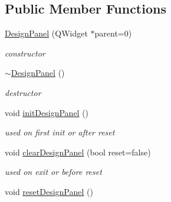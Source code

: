 \subsection*{Public Member Functions}
\begin{DoxyCompactItemize}
\item 
\hyperlink{classgui_1_1DesignPanel_a96429541df71c297fed42ae90744baf0}{Design\+Panel} (Q\+Widget $\ast$parent=0)\hypertarget{classgui_1_1DesignPanel_a96429541df71c297fed42ae90744baf0}{}\label{classgui_1_1DesignPanel_a96429541df71c297fed42ae90744baf0}

\begin{DoxyCompactList}\small\item\em constructor \end{DoxyCompactList}\item 
\hyperlink{classgui_1_1DesignPanel_aaf0992b9895822ba207eab17fd0023d9}{$\sim$\+Design\+Panel} ()\hypertarget{classgui_1_1DesignPanel_aaf0992b9895822ba207eab17fd0023d9}{}\label{classgui_1_1DesignPanel_aaf0992b9895822ba207eab17fd0023d9}

\begin{DoxyCompactList}\small\item\em destructor \end{DoxyCompactList}\item 
void \hyperlink{classgui_1_1DesignPanel_aed5d80b7651f3e25842d28f6192d4132}{init\+Design\+Panel} ()\hypertarget{classgui_1_1DesignPanel_aed5d80b7651f3e25842d28f6192d4132}{}\label{classgui_1_1DesignPanel_aed5d80b7651f3e25842d28f6192d4132}

\begin{DoxyCompactList}\small\item\em used on first init or after reset \end{DoxyCompactList}\item 
void \hyperlink{classgui_1_1DesignPanel_a5535f348b3dbcd86b15eed386b533dfc}{clear\+Design\+Panel} (bool reset=false)\hypertarget{classgui_1_1DesignPanel_a5535f348b3dbcd86b15eed386b533dfc}{}\label{classgui_1_1DesignPanel_a5535f348b3dbcd86b15eed386b533dfc}

\begin{DoxyCompactList}\small\item\em used on exit or before reset \end{DoxyCompactList}\item 
void \hyperlink{classgui_1_1DesignPanel_aa26b2b409d8f5b038270381b9eaf80cf}{reset\+Design\+Panel} ()\hypertarget{classgui_1_1DesignPanel_aa26b2b409d8f5b038270381b9eaf80cf}{}\label{classgui_1_1DesignPanel_aa26b2b409d8f5b038270381b9eaf80cf}


\end{DoxyCompactItemize}
